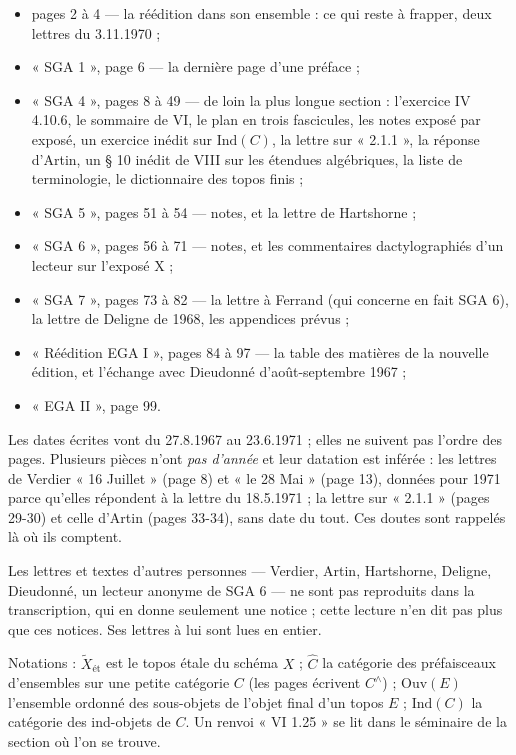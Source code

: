 \documentclass[11pt,a4paper]{article}
\begin{document}
\begin{itemize}
\item pages 2 à 4 --- la réédition dans son ensemble : ce qui reste à
frapper, deux lettres du 3.11.1970 ;
\item « SGA 1 », page 6 --- la dernière page d'une préface ;
\item « SGA 4 », pages 8 à 49 --- de loin la plus longue section :
l'exercice IV 4.10.6, le sommaire de VI, le plan en trois fascicules, les
notes exposé par exposé, un exercice inédit sur $\mathrm{Ind}(C)$, la lettre
sur « 2.1.1 », la réponse d'Artin, un § 10 inédit de VIII sur les étendues
algébriques, la liste de terminologie, le dictionnaire des topos finis ;
\item « SGA 5 », pages 51 à 54 --- notes, et la lettre de Hartshorne ;
\item « SGA 6 », pages 56 à 71 --- notes, et les commentaires dactylographiés
d'un lecteur sur l'exposé X ;
\item « SGA 7 », pages 73 à 82 --- la lettre à Ferrand (qui concerne en fait
SGA 6), la lettre de Deligne de 1968, les appendices prévus ;
\item « Réédition EGA I », pages 84 à 97 --- la table des matières de la
nouvelle édition, et l'échange avec Dieudonné d'août-septembre 1967 ;
\item « EGA II », page 99.
\end{itemize}

Les dates écrites vont du 27.8.1967 au 23.6.1971 ; elles ne suivent pas
l'ordre des pages. Plusieurs pièces n'ont \emph{pas d'année} et leur datation
est inférée : les lettres de Verdier « 16 Juillet » (page 8) et « le 28 Mai »
(page 13), données pour 1971 parce qu'elles répondent à la lettre du
18.5.1971 ; la lettre sur « 2.1.1 » (pages 29-30) et celle d'Artin (pages
33-34), sans date du tout. Ces doutes sont rappelés là où ils comptent.

Les lettres et textes d'autres personnes --- Verdier, Artin, Hartshorne,
Deligne, Dieudonné, un lecteur anonyme de SGA 6 --- ne sont pas reproduits
dans la transcription, qui en donne seulement une notice ; cette lecture
n'en dit pas plus que ces notices. Ses lettres à lui sont lues en entier.

Notations : $\widetilde{X}_{\text{ét}}$ est le topos étale du schéma $X$ ;
$\widehat{C}$ la catégorie des préfaisceaux d'ensembles sur une petite
catégorie $C$ (les pages écrivent $C^{\wedge}$) ; $\mathrm{Ouv}(E)$ l'ensemble
ordonné des sous-objets de l'objet final d'un topos $E$ ; $\mathrm{Ind}(C)$ la
catégorie des ind-objets de $C$. Un renvoi « VI 1.25 » se lit dans le
séminaire de la section où l'on se trouve.
\end{document}

